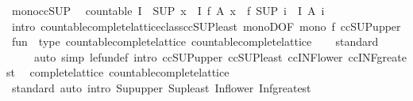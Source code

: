 \begin{isabellebody}
\endisatagproof
{\isafoldproof}%
%
\isadelimproof
\isanewline
%
\endisadelimproof
\isanewline
{}\isamarkupfalse%
\ mono{\isacharunderscore}ccSUP{\isacharcolon}\isanewline
\ \ {\isachardoublequoteopen}countable\ I\ {\isasymLongrightarrow}\ {\isacharparenleft}SUP\ x\ {\isacharcolon}\ I{\isachardot}\ f\ {\isacharparenleft}A\ x{\isacharparenright}{\isacharparenright}\ {\isasymle}\ f\ {\isacharparenleft}SUP\ i\ {\isacharcolon}\ I{\isachardot}\ A\ i{\isacharparenright}{\isachardoublequoteclose}\isanewline
%
\isadelimproof
\ \ %
\endisadelimproof
%
\isatagproof
{}\isamarkupfalse%
\ {\isacharparenleft}intro\ countable{\isacharunderscore}complete{\isacharunderscore}lattice{\isacharunderscore}class{\isachardot}ccSUP{\isacharunderscore}least\ monoD{\isacharbrackleft}OF\ {\isacartoucheopen}mono\ f{\isacartoucheclose}{\isacharbrackright}\ ccSUP{\isacharunderscore}upper{\isacharparenright}%
\endisatagproof
{\isafoldproof}%
%
\isadelimproof
\isanewline
%
\endisadelimproof
\isanewline
{}\isamarkupfalse%
\isanewline
\isanewline
{}\isamarkupfalse%
%
\isadelimdocument
%
\endisadelimdocument
%
\isatagdocument
%
\isamarkuptrue%
%
\endisatagdocument
{\isafolddocument}%
%
\isadelimdocument
%
\endisadelimdocument
{}\isamarkupfalse%
\ {\isachardoublequoteopen}fun{\isachardoublequoteclose}\ {\isacharcolon}{\isacharcolon}\ {\isacharparenleft}type{\isacharcomma}\ countable{\isacharunderscore}complete{\isacharunderscore}lattice{\isacharparenright}\ countable{\isacharunderscore}complete{\isacharunderscore}lattice\isanewline
%
\isadelimproof
\ \ %
\endisadelimproof
%
\isatagproof
{}\isamarkupfalse%
\ standard\isanewline
\ \ \ \ \ {\isacharparenleft}auto\ simp{\isacharcolon}\ le{\isacharunderscore}fun{\isacharunderscore}def\ intro{\isacharbang}{\isacharcolon}\ ccSUP{\isacharunderscore}upper\ ccSUP{\isacharunderscore}least\ ccINF{\isacharunderscore}lower\ ccINF{\isacharunderscore}greatest{\isacharparenright}%
\endisatagproof
{\isafoldproof}%
%
\isadelimproof
\isanewline
%
\endisadelimproof
\isanewline
{}\isamarkupfalse%
\ {\isacharparenleft}\ complete{\isacharunderscore}lattice{\isacharparenright}\ countable{\isacharunderscore}complete{\isacharunderscore}lattice\isanewline
%
\isadelimproof
\ \ %
\endisadelimproof
%
\isatagproof
{}\isamarkupfalse%
\ standard\ {\isacharparenleft}auto\ intro{\isacharcolon}\ Sup{\isacharunderscore}upper\ Sup{\isacharunderscore}least\ Inf{\isacharunderscore}lower\ Inf{\isacharunderscore}greatest{\isacharparenright}%

\end{isabellebody}
